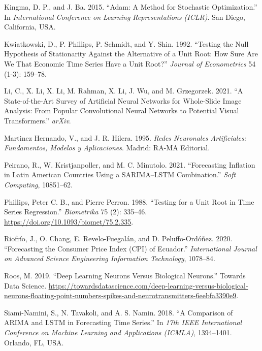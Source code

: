 \documentclass[
  12pt, a4paper, oneside]{article}
\newlength{\cslhangindent}
\newenvironment{CSLReferences}[2] %
 {\begin{list}{}{%
  \setlength{\itemindent}{0pt}
  \setlength{\leftmargin}{0pt}
  \setlength{\parsep}{0pt}
  \ifodd #1
   \setlength{\leftmargin}{\cslhangindent}
   \setlength{\itemindent}{-1\cslhangindent}
  \fi
  \setlength{\itemsep}{#2\baselineskip}}}
 {\end{list}}
\begin{document}
\begin{CSLReferences}{1}{0}
Kingma, D. P., and J. Ba. 2015. {``Adam: A Method for Stochastic Optimization.''} In \emph{International Conference on Learning Representations (ICLR)}. San Diego, California, USA.

Kwiatkowski, D., P. Phillips, P. Schmidt, and Y. Shin. 1992. {``Testing the Null Hypothesis of Stationarity Against the Alternative of a Unit Root: How Sure Are We That Economic Time Series Have a Unit Root?''} \emph{Journal of Econometrics} 54 (1-3): 159--78.

Li, C., X. Li, X. Li, M. Rahman, X. Li, J. Wu, and M. Grzegorzek. 2021. {``A State-of-the-Art Survey of Artificial Neural Networks for Whole-Slide Image Analysis: From Popular Convolutional Neural Networks to Potential Visual Transformers.''} \emph{arXiv}.

Martinez Hernando, V., and J. R. Hilera. 1995. \emph{Redes Neuronales Artificiales: Fundamentos, Modelos y Aplicaciones}. Madrid: RA-MA Editorial.

Peirano, R., W. Kristjanpoller, and M. C. Minutolo. 2021. {``Forecasting Inflation in Latin American Countries Using a SARIMA--LSTM Combination.''} \emph{Soft Computing}, 10851--62.

Phillips, Peter C. B., and Pierre Perron. 1988. {``Testing for a Unit Root in Time Series Regression.''} \emph{Biometrika} 75 (2): 335--46. \url{https://doi.org/10.1093/biomet/75.2.335}.

Riofrío, J., O. Chang, E. Revelo-Fuegalán, and D. Peluffo-Ordóñez. 2020. {``Forecasting the Consumer Price Index (CPI) of Ecuador.''} \emph{International Journal on Advanced Science Engineering Information Technology}, 1078--84.

Roos, M. 2019. {``Deep Learning Neurons Versus Biological Neurons.''} Towards Data Science. \url{https://towardsdatascience.com/deep-learning-versus-biological-neurons-floating-point-numbers-spikes-and-neurotransmitters-6eebfa3390e9}.

Siami-Namini, S., N. Tavakoli, and A. S. Namin. 2018. {``A Comparison of ARIMA and LSTM in Forecasting Time Series.''} In \emph{17th IEEE International Conference on Machine Learning and Applications (ICMLA)}, 1394--1401. Orlando, FL, USA.


\end{CSLReferences}
\end{document}
